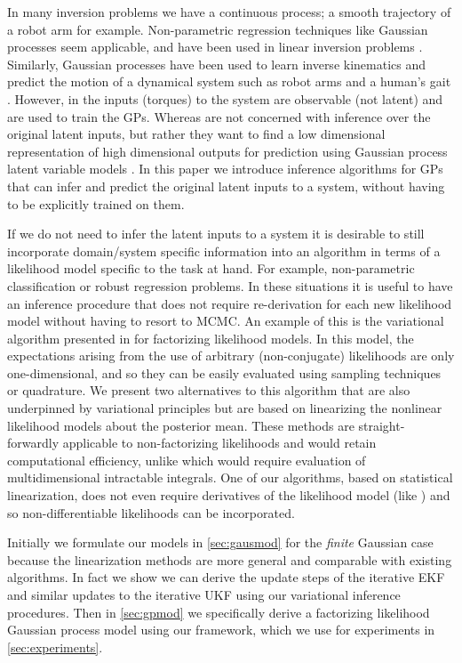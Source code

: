\documentclass{article} %
\begin{document}
In many inversion problems we have a continuous process; a smooth trajectory of
a robot arm for example. Non-parametric regression techniques like Gaussian
processes \cite{Rasmussen2006} seem applicable, and have been used in linear
inversion problems \cite{Reid2013}. Similarly, Gaussian processes have been
used to learn inverse kinematics and predict the motion of a dynamical system
such as robot arms \cite{Rasmussen2006, Williams2008} and a human's gait
\cite{Lawrence2003, Wang2005, Wang2008}.  However, in \cite{Rasmussen2006,
    Williams2008} the inputs (torques) to the system are observable (not
latent) and are used to train the GPs. Whereas \cite{Wang2005, Wang2008} are
not concerned with inference over the original latent inputs, but rather they
want to find a low dimensional representation of high dimensional outputs for
prediction using Gaussian process latent variable models \cite{Lawrence2003}.
In this paper we introduce inference algorithms for GPs that can infer and
predict the original latent inputs to a system, without having to be explicitly
trained on them.

If we do not need to infer the latent inputs to a system it is desirable to
still incorporate domain/system specific information into an algorithm in terms
of a likelihood model specific to the task at hand. For example, non-parametric
classification or robust regression problems. In these situations it is useful
to have an inference procedure that does not require re-derivation for each new
likelihood model without having to resort to MCMC. An example of this is the
variational algorithm presented in \cite{Opper2009} for factorizing likelihood
models. In this model, the expectations arising from the use of arbitrary
(non-conjugate) likelihoods are only one-dimensional, and so they can be easily
evaluated using sampling techniques or quadrature. 
%
We present two alternatives to this algorithm that are also underpinned by
variational principles but  are based on linearizing the nonlinear likelihood
models about the posterior mean. These methods are straight-forwardly
applicable to non-factorizing likelihoods and would retain computational
efficiency, unlike \cite{Opper2009} which would require evaluation of
multidimensional intractable integrals. One of our algorithms, based on
statistical linearization, does not even require derivatives of the likelihood
model (like \cite{Opper2009}) and so non-differentiable likelihoods can be
incorporated.

Initially we formulate our models in \autoref{sec:gausmod} for the
\emph{finite} Gaussian case because the linearization methods are more general
and comparable with existing algorithms. In fact we show we can derive the
update steps of the iterative EKF \cite{Bell1993} and similar updates to the
iterative UKF \cite{Sibley2006} using our variational inference procedures.
Then in \autoref{sec:gpmod} we specifically derive a factorizing likelihood
Gaussian process model using our framework, which we use for experiments in
\autoref{sec:experiments}.
\end{document}
